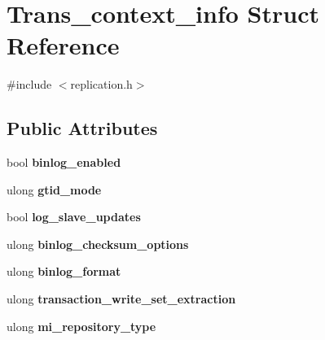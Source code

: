 \hypertarget{structTrans__context__info}{}\section{Trans\+\_\+context\+\_\+info Struct Reference}
\label{structTrans__context__info}


{\ttfamily \#include $<$replication.\+h$>$}

\subsection*{Public Attributes}
\begin{DoxyCompactItemize}
\item 
\mbox{\label{structTrans__context__info_acb10e709b75c9322c551b360d3dd6496}} 
bool {\bfseries binlog\+\_\+enabled}
\item 
\mbox{\label{structTrans__context__info_a110d813bb3eefec86910839fb88b86d2}} 
ulong {\bfseries gtid\+\_\+mode}
\item 
\mbox{\label{structTrans__context__info_a6b8bc95ee10a11e816acf4020105bd04}} 
bool {\bfseries log\+\_\+slave\+\_\+updates}
\item 
\mbox{\label{structTrans__context__info_affa66e4cdb3b39eec853347284340a60}} 
ulong {\bfseries binlog\+\_\+checksum\+\_\+options}
\item 
\mbox{\label{structTrans__context__info_a396432a5aeffa7270433dbe5ca4c9806}} 
ulong {\bfseries binlog\+\_\+format}
\item 
\mbox{\label{structTrans__context__info_a619cebcefede22512d6f37e3c31fb5a8}} 
ulong {\bfseries transaction\+\_\+write\+\_\+set\+\_\+extraction}
\item 
\mbox{\label{structTrans__context__info_a2f4817575bd84501325f06b0691ae703}} 
ulong {\bfseries mi\+\_\+repository\+\_\+type}
\item 
\mbox{\label{structTrans__context__info_a1193f79b68f11bda66bc5cafae79be83}} 

\end{DoxyCompactItemize}
